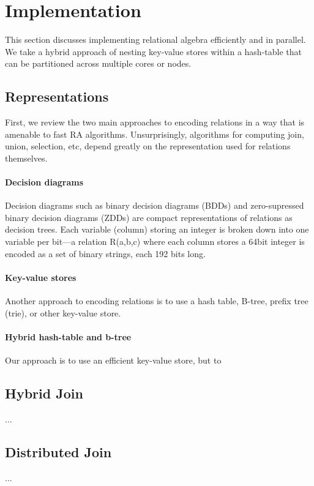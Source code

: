 

\section{Implementation}
\label{sec:impl}
%
This section discusses implementing relational algebra efficiently and in parallel. We take a hybrid approach of nesting key-value stores within a hash-table that can be partitioned across multiple cores or nodes. 


\subsection{Representations}

First, we review the two main approaches to encoding relations in a way that is amenable to fast RA algorithms. Unsurprisingly, algorithms for computing join, union, selection, etc, depend greatly on the representation used for relations themselves.

\paragraph{Decision diagrams} Decision diagrams such as binary decision diagrams (BDDs) and zero-supressed binary decision diagrams (ZDDs) are compact representations of relations as decision trees. Each variable (column) storing an integer is broken down into one variable per bit---a relation R(a,b,c) where each column stores a 64bit integer is encoded as a set of binary strings, each 192 bits long.  


\paragraph{Key-value stores} Another approach to encoding relations is to use a hash table, B-tree, prefix tree (trie), or other key-value store.


\paragraph{Hybrid hash-table and b-tree} Our approach is to use an efficient key-value store, but to



\subsection{Hybrid Join}

...

\subsection{Distributed Join}

...
